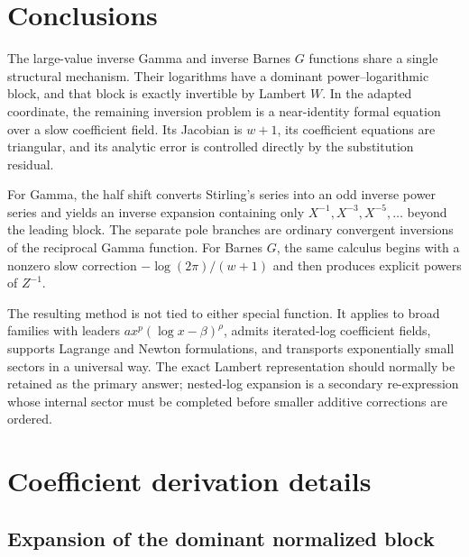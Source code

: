 \documentclass[11pt,a4paper]{article}
\numberwithin{equation}{section}
\theoremstyle{definition}
\theoremstyle{remark}
\begin{document}
\section{Conclusions}

The large-value inverse Gamma and inverse Barnes \(G\) functions share a
single structural mechanism.  Their logarithms have a dominant
power--logarithmic block, and that block is exactly invertible by Lambert
\(W\).  In the adapted coordinate, the remaining inversion problem is a
near-identity formal equation over a slow coefficient field.  Its
Jacobian is \(w+1\), its coefficient equations are triangular, and its
analytic error is controlled directly by the substitution residual.

For Gamma, the half shift converts Stirling's series into an odd inverse
power series and yields an inverse expansion containing only
\(X^{-1},X^{-3},X^{-5},\ldots\) beyond the leading block.  The separate pole
branches are ordinary convergent inversions of the reciprocal Gamma
function.  For Barnes \(G\), the same calculus begins with a nonzero slow
correction \(-\log(2\pi)/(w+1)\) and then produces explicit powers of
\(Z^{-1}\).

The resulting method is not tied to either special function.  It applies
to broad families with leaders \(a x^p(\log x-\beta)^\rho\), admits
iterated-log coefficient fields, supports Lagrange and Newton formulations,
and transports exponentially small sectors in a universal way.  The exact
Lambert representation should normally be retained as the primary answer;
nested-log expansion is a secondary re-expression whose internal sector
must be completed before smaller additive corrections are ordered.

\appendix

\section{Coefficient derivation details}

\subsection{Expansion of the dominant normalized block}
\end{document}

